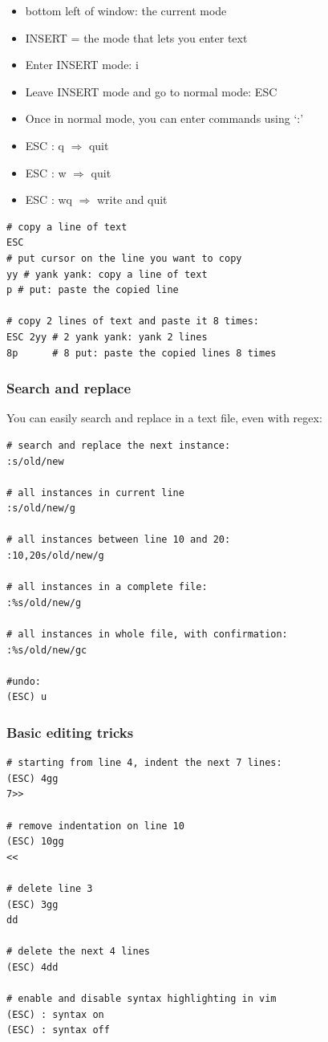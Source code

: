 \documentclass{article}
\begin{document}
\begin{itemize}
    \item bottom left of window: the current mode
    \item INSERT = the mode that lets you enter text
    \item Enter INSERT mode: i
    \item Leave INSERT mode and go to normal mode: ESC
    \item Once in normal mode, you can enter commands using `:'
    \item ESC : q $\Rightarrow$ quit
    \item ESC : w $\Rightarrow$ quit
    \item ESC : wq $\Rightarrow$ write and quit
\end{itemize}

\begin{verbatim}
# copy a line of text
ESC
# put cursor on the line you want to copy
yy # yank yank: copy a line of text
p # put: paste the copied line

# copy 2 lines of text and paste it 8 times:
ESC 2yy # 2 yank yank: yank 2 lines
8p      # 8 put: paste the copied lines 8 times
\end{verbatim}

\subsubsection{Search and replace}

You can easily search and replace in a text file, even with regex:

\begin{verbatim}
# search and replace the next instance:
:s/old/new

# all instances in current line
:s/old/new/g

# all instances between line 10 and 20:
:10,20s/old/new/g

# all instances in a complete file:
:%s/old/new/g

# all instances in whole file, with confirmation:
:%s/old/new/gc

#undo:
(ESC) u
\end{verbatim}

\subsubsection{Basic editing tricks}

\begin{verbatim}
# starting from line 4, indent the next 7 lines:
(ESC) 4gg
7>>

# remove indentation on line 10
(ESC) 10gg
<<

# delete line 3
(ESC) 3gg
dd

# delete the next 4 lines
(ESC) 4dd

# enable and disable syntax highlighting in vim
(ESC) : syntax on
(ESC) : syntax off
\end{verbatim}
\end{document}
